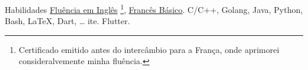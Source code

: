 
\begin{rubric}{Habilidades}
\entry*[Línguas]
    \href{https://drive.google.com/file/d/1PTySqO2pdP8BjxMf1Vgrz0EzpBxw9jYq/view?usp=sharing}{Fluência em Inglês}
    \footnote{Certificado emitido antes do intercâmbio para a França, onde aprimorei consideralvemente minha fluência.},
    \href{https://drive.google.com/file/d/1yjeEiOAcLmwbUxXELqplRyCWaUSi7e8C/view?usp=sharing}{Francês Básico}.
    C/C++, Golang, Java, Python, Bash, \LaTeX, Dart, \ldots
\entry*[Databases]
    ite.
    Flutter.
\end{rubric}
